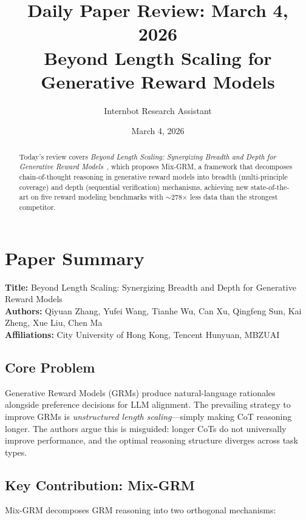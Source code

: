 \documentclass[11pt]{article}
\title{Daily Paper Review: March 4, 2026\\Beyond Length Scaling for Generative Reward Models}
\author{Internbot Research Assistant}
\date{March 4, 2026}
\begin{document}
\maketitle

\begin{abstract}
Today's review covers \emph{Beyond Length Scaling: Synergizing Breadth and Depth for Generative Reward Models}~\citep{zhang2026mixgrm}, which proposes Mix-GRM, a framework that decomposes chain-of-thought reasoning in generative reward models into breadth (multi-principle coverage) and depth (sequential verification) mechanisms, achieving new state-of-the-art on five reward modeling benchmarks with $\sim$278$\times$ less data than the strongest competitor.
\end{abstract}

\section{Paper Summary}

\textbf{Title:} Beyond Length Scaling: Synergizing Breadth and Depth for Generative Reward Models\\
\textbf{Authors:} Qiyuan Zhang, Yufei Wang, Tianhe Wu, Can Xu, Qingfeng Sun, Kai Zheng, Xue Liu, Chen Ma\\
\textbf{Affiliations:} City University of Hong Kong, Tencent Hunyuan, MBZUAI

\subsection{Core Problem}

Generative Reward Models (GRMs) produce natural-language rationales alongside preference decisions for LLM alignment. The prevailing strategy to improve GRMs is \emph{unstructured length scaling}---simply making CoT reasoning longer. The authors argue this is misguided: longer CoTs do not universally improve performance, and the optimal reasoning structure diverges across task types.

\subsection{Key Contribution: Mix-GRM}

Mix-GRM decomposes GRM reasoning into two orthogonal mechanisms:
\end{document}
